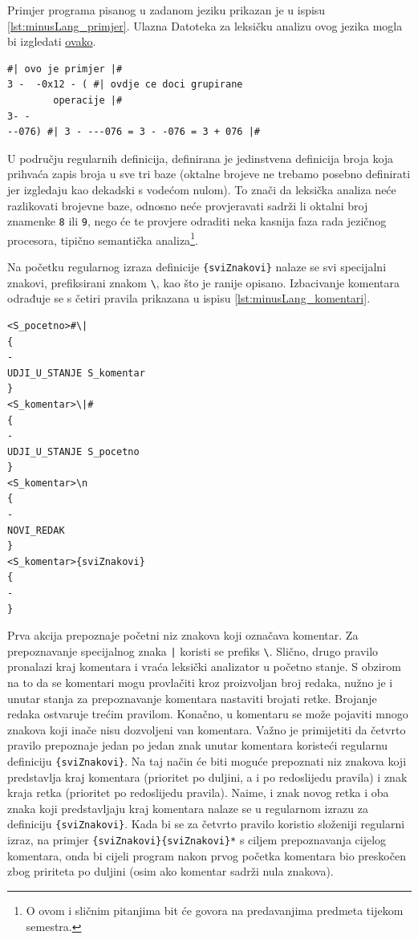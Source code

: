 \documentclass[times, 12pt, utf8]{book}
\begin{document}
Primjer programa pisanog u zadanom jeziku prikazan je u ispisu \ref{lst:minusLang_primjer}.
Ulazna Datoteka za leksičku analizu ovog jezika mogla bi izgledati \href{https://github.com/fer-ppj/ppj-labosi/raw/master/res/lab1/minusLang.lan}{ovako}.

\begin{lstlisting}[caption={Primjer programa pisanog u jeziku \emph{minusLang}.},label=lst:minusLang_primjer]
#| ovo je primjer |#
3 -  -0x12 - ( #| ovdje ce doci grupirane
		operacije |#
3- -
--076) #| 3 - ---076 = 3 - -076 = 3 + 076 |#

\end{lstlisting}

U području regularnih definicija, definirana je jedinstvena definicija broja koja prihvaća zapis broja u sve tri baze (oktalne brojeve ne trebamo posebno definirati jer izgledaju kao dekadski s vodećom nulom).
To znači da leksička analiza neće razlikovati brojevne baze, odnosno neće provjeravati sadrži li oktalni broj znamenke \verb|8| ili \verb|9|, nego će te provjere odraditi neka kasnija faza rada jezičnog procesora, tipično semantička analiza\footnote{O ovom i sličnim pitanjima bit će govora na predavanjima predmeta tijekom semestra.}.

Na početku regularnog izraza definicije \verb|{sviZnakovi}| nalaze se svi specijalni znakovi, prefiksirani znakom \verb|\|, kao što je ranije opisano.
Izbacivanje komentara odrađuje se s četiri pravila prikazana u ispisu \ref{lst:minusLang_komentari}.

\begin{lstlisting}[caption={Pravila za izbacivanje komentara iz ulaznog programa.},label=lst:minusLang_komentari]
<S_pocetno>#\|
{
-
UDJI_U_STANJE S_komentar
}
<S_komentar>\|#
{
-
UDJI_U_STANJE S_pocetno
}
<S_komentar>\n
{
-
NOVI_REDAK
}
<S_komentar>{sviZnakovi}
{
-
}
\end{lstlisting}

Prva akcija prepoznaje početni niz znakova koji označava komentar.
Za prepoznavanje specijalnog znaka \verb=|= koristi se prefiks \verb|\|.
Slično, drugo pravilo pronalazi kraj komentara i vraća leksički analizator u početno stanje.
S obzirom na to da se komentari mogu provlačiti kroz proizvoljan broj redaka, nužno je i unutar stanja za prepoznavanje komentara nastaviti brojati retke.
Brojanje redaka ostvaruje trećim pravilom.
Konačno, u komentaru se može pojaviti mnogo znakova koji inače nisu dozvoljeni van komentara.
Važno je primijetiti da četvrto pravilo prepoznaje jedan po jedan znak unutar komentara koristeći regularnu definiciju \verb|{sviZnakovi}|.
Na taj način će biti moguće prepoznati niz znakova koji predstavlja kraj komentara (prioritet po duljini, a i po redoslijedu pravila) i znak kraja retka (prioritet po redoslijedu pravila).
Naime, i znak novog retka i oba znaka koji predstavljaju kraj komentara nalaze se u regularnom izrazu za definiciju \verb|{sviZnakovi}|.
Kada bi se za četvrto pravilo koristio složeniji regularni izraz, na primjer \verb|{sviZnakovi}{sviZnakovi}*| s ciljem prepoznavanja cijelog komentara, onda bi cijeli program nakon prvog početka komentara bio preskočen zbog pririteta po duljini (osim ako komentar sadrži nula znakova).
\end{document}
